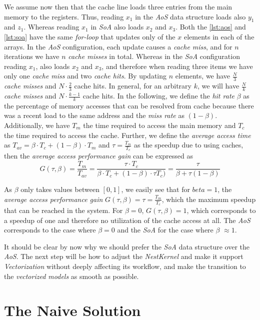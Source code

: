 We assume now then that the cache line loads three entries from the main memory to the registers. Thus, reading $x_1$ in the \emph{AoS} data structure loads also $y_1$ and $z_1$. Whereas reading $x_1$ in \emph{SoA} also loads $x_2$ and $x_3$. Both the \autoref{lst:aos} and \autoref{lst:soa} have the same \emph{for-loop} that updates only of the $x$ elements in each of the arrays. In the \emph{AoS} configuration, each update causes a \emph{cache miss}, and for $n$ iterations we have $n$ \emph{cache misses} in total. Whereas in the \emph{SoA} configuration reading $x_1$, also loads $x_2$ and $x_3$, and therefore when reading three items we have only one \emph{cache miss} and two \emph{cache hits}. By updating $n$ elements, we have $\frac{N}{3}$ \emph{cache misses} and $N \cdot \frac{2}{3}$ cache hits. In general, for an arbitrary $k$, we will have $\frac{N}{k}$ \emph{cache misses} and $N \cdot \frac{k-1}{k}$ cache hits. In the following, we define the \emph{hit rate} $\beta$ as the percentage of memory accesses that can be resolved from cache because
there was a recent load to the same address and the \emph{miss rate} as $(1 - \beta)$. Additionally, we have $T_m$ the time required to access the main memory and $T_c$ the time required to access the cache. Further, we define the \emph{average access time} as $T_{av} = \beta \cdot T_c + (1 - \beta) \cdot T_m$ and $\tau = \frac{T_m}{T_c}$ as the speedup due to using caches, then the \emph{average
access performance gain} can be expressed as $$G(\tau, \beta) = \frac{T_m}{T_{av}} = \frac{\tau \cdot T_c}{\beta \cdot T_c + (1 - \beta)\cdot \tau T_c)} = \frac{\tau}{\beta + \tau (1 - \beta)}$$


As $\beta$ only takes values between $[0, 1]$, we easily see that for $beta = 1$, the \emph{average access performance gain} $G(\tau, \beta) = \tau = \frac{T_m}{T_c}$, which the maximum speedup that can be reached in the system. For $\beta =0$, $G(\tau, \beta) = 1$, which corresponds to a speedup of one and therefore no utilization of the cache access at all. The \emph{AoS} corresponds to the case where $\beta = 0$ and the \emph{SoA} for the case where $\beta$ $\approx 1$.

It should be clear by now why we should prefer the \emph{SoA} data structure over  the \emph{AoS}. The next step will be how to adjust the \emph{NestKernel} and make it support \emph{Vectorization} without deeply affecting its workflow, and make the transition to the \emph{vectorized models} as smooth as possible.

\section{The Naive Solution}

